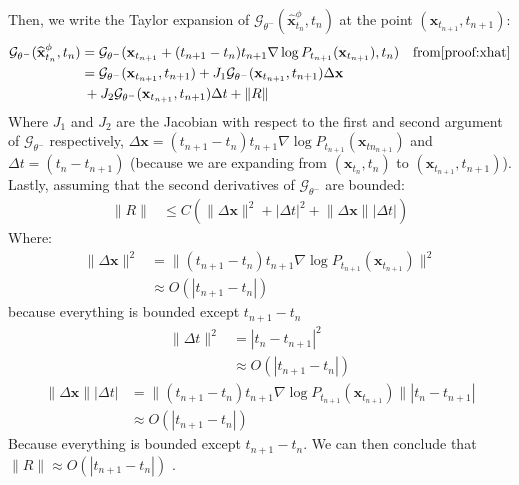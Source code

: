 \noindent Then, we write the Taylor expansion of $\mathcal{G}_{\theta^-}(\widehat{\mathbf{x}}_{t_{n}}^{\phi}, t_{n})$ at the point $(\mathbf{x}_{t_{n+1}}, t_{n+1})$:
\begin{align}
   \mathcal{G}_{\theta^-}(\widehat{\mathbf{x}}_{t_{n}}^{\phi}, t_{n}) & = \mathcal{G}_{\theta^-}(\mathbf{x}_{t_{n+1}} + (t_{n+1} - t_n)t_{n+1}\nabla \log P_{t_{n+1}}(\mathbf{x}_{t_{n+1}}), t_n) & \text{from} \ref{proof:xhat} \\
   & = \mathcal{G}_{\theta^-}(\mathbf{x}_{t_{n+1}}, t_{n+1}) + J_1\mathcal{G}_{\theta^-}(\mathbf{x}_{t_{n+1}}, t_{n+1})\Delta \mathbf{x} \\ 
   & \: + J_2\mathcal{G}_{\theta^-}(\mathbf{x}_{t_{n+1}}, t_{n+1})\Delta t + \lVert R \rVert \label{proof:taylor}
\end{align}
\noindent Where $J_1$ and $J_2$ are the Jacobian with respect to the first and second argument of $\mathcal{G}_{\theta^-}$ respectively, $\Delta \mathbf{x} = (t_{n+1} - t_n)t_{n+1}\nabla \log P_{t_{n+1}}(\mathbf{x}_{tn_{n+1}})$ and $\Delta t = (t_n - t_{n + 1})$ (because we are expanding from $(\mathbf{x}_{t_{n}}, t_{n})$ to $(\mathbf{x}_{t_{n+1}}, t_{n+1})$). Lastly, assuming that the second derivatives of $\mathcal{G}_{\theta^-}$ are bounded:
\begin{align}
    \lVert R \rVert & \leq C \left( \lVert \Delta \mathbf{x}\rVert^2 + | \Delta t|^2 + \lVert \Delta \mathbf{x}\rVert |\Delta t| \right)
\end{align} 
\noindent Where:
\begin{align}
    \lVert \Delta \mathbf{x}\rVert^2 &= \lVert (t_{n+1} - t_n)t_{n+1}\nabla \log P_{t_{n+1}}(\mathbf{x}_{t_{n+1}}) \rVert^2\\
    & \approx O(| t_{n+1} - t_n|)
\end{align}
\noindent because everything is bounded except $t_{n+1} - t_n$
\begin{align}
    \lVert \Delta t\rVert^2 &= | t_n - t_{n + 1}|^2 \\
    & \approx  O(| t_{n+1} - t_n|)
\end{align}
\begin{align}
    \lVert \Delta \mathbf{x}\rVert |\Delta t| & = \lVert (t_{n+1} - t_n)t_{n+1}\nabla \log P_{t_{n+1}}(\mathbf{x}_{t_{n+1}}) \rVert | t_n - t_{n + 1}| \\
    & \approx O(| t_{n+1} - t_n|)
\end{align}
\noindent Because everything is bounded except $t_{n+1} - t_n$. We can then conclude that $\lVert R \rVert \approx O(| t_{n+1} - t_n|)$ \label{proof:O}. \\

